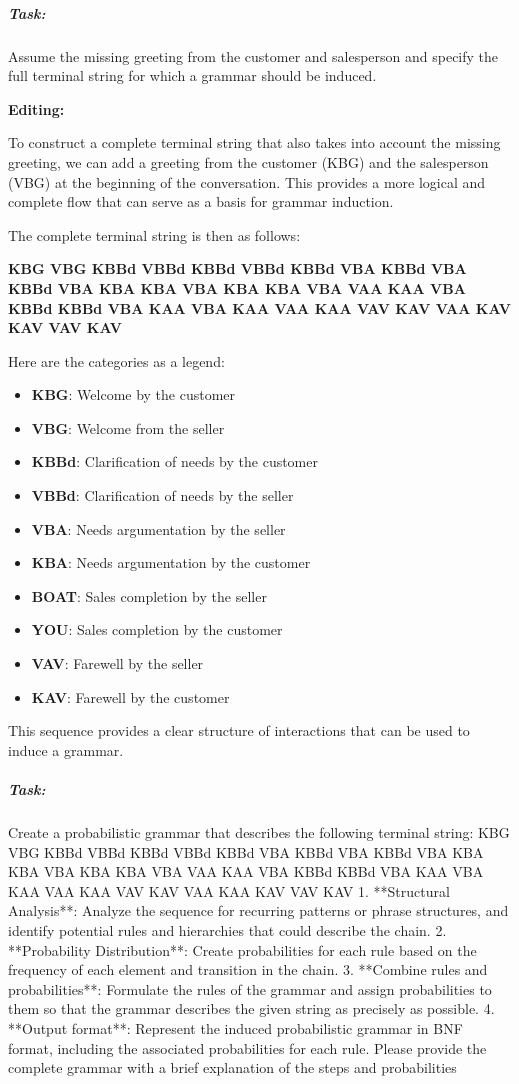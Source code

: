 \documentclass[
]{article}
\begin{document}
\subparagraph{\texorpdfstring{\textbf{Task:}}{Task:}}\label{task-1}

Assume the missing greeting from the customer and salesperson and
specify the full terminal string for which a grammar should be induced.

\textbf{Editing:}

To construct a complete terminal string that also takes into account the
missing greeting, we can add a greeting from the customer (KBG) and the
salesperson (VBG) at the beginning of the conversation. This provides a
more logical and complete flow that can serve as a basis for grammar
induction.

The complete terminal string is then as follows:

\textbf{KBG VBG KBBd VBBd KBBd VBBd KBBd VBA KBBd VBA KBBd VBA KBA KBA
VBA KBA KBA VBA VAA KAA VBA KBBd KBBd VBA KAA VBA KAA VAA KAA VAV KAV
VAA KAV KAV VAV KAV}

Here are the categories as a legend:

\begin{itemize}
\item
  \textbf{KBG}: Welcome by the customer
\item
  \textbf{VBG}: Welcome from the seller
\item
  \textbf{KBBd}: Clarification of needs by the customer
\item
  \textbf{VBBd}: Clarification of needs by the seller
\item
  \textbf{VBA}: Needs argumentation by the seller
\item
  \textbf{KBA}: Needs argumentation by the customer
\item
  \textbf{BOAT}: Sales completion by the seller
\item
  \textbf{YOU}: Sales completion by the customer
\item
  \textbf{VAV}: Farewell by the seller
\item
  \textbf{KAV}: Farewell by the customer
\end{itemize}

This sequence provides a clear structure of interactions that can be
used to induce a grammar.

\subparagraph{\texorpdfstring{\textbf{Task:}}{Task:}}\label{task-2}

Create a probabilistic grammar that describes the following terminal
string: KBG VBG KBBd VBBd KBBd VBBd KBBd VBA KBBd VBA KBBd VBA KBA KBA
VBA KBA KBA VBA VAA KAA VBA KBBd KBBd VBA KAA VBA KAA VAA KAA VAV KAV
VAA KAA KAV VAV KAV 1. **Structural Analysis**: Analyze the sequence for
recurring patterns or phrase structures, and identify potential rules
and hierarchies that could describe the chain. 2. **Probability
Distribution**: Create probabilities for each rule based on the
frequency of each element and transition in the chain. 3. **Combine
rules and probabilities**: Formulate the rules of the grammar and assign
probabilities to them so that the grammar describes the given string as
precisely as possible. 4. **Output format**: Represent the induced
probabilistic grammar in BNF format, including the associated
probabilities for each rule. Please provide the complete grammar with a
brief explanation of the steps and probabilities
\end{document}
